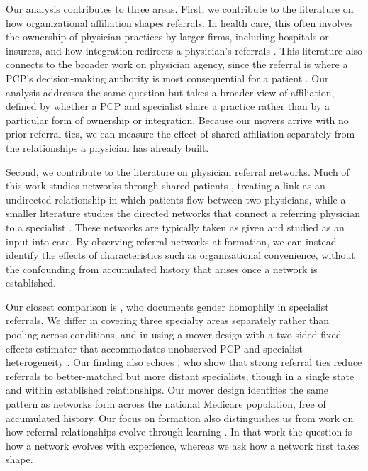 \documentclass[12pt]{article}
\begin{document}
Our analysis contributes to three areas. First, we contribute to the literature on how organizational affiliation shapes referrals. In health care, this often involves the ownership of physician practices by larger firms, including hospitals or insurers, and how integration redirects a physician's referrals \citep{baker2016, walden2016, singh2023, whaley2024-jpube, cutler2026}. This literature also connects to the broader work on physician agency, since the referral is where a PCP's decision-making authority is most consequential for a patient \citep{freedman2015, barkowski2018, chernew2021, lin2025}. Our analysis addresses the same question but takes a broader view of affiliation, defined by whether a PCP and specialist share a practice rather than by a particular form of ownership or integration. Because our movers arrive with no prior referral ties, we can measure the effect of shared affiliation separately from the relationships a physician has already built.

Second, we contribute to the literature on physician referral networks. Much of this work studies networks through shared patients \citep{landon2012, barnett2012mc, landon2018, linde2019}, treating a link as an undirected relationship in which patients flow between two physicians, while a smaller literature studies the directed networks that connect a referring physician to a specialist \citep{agha2019, agha2018, zeltzer2020}. These networks are typically taken as given and studied as an input into care. By observing referral networks at formation, we can instead identify the effects of characteristics such as organizational convenience, without the confounding from accumulated history that arises once a network is established.

Our closest comparison is \cite{zeltzer2020}, who documents gender homophily in specialist referrals. We differ in covering three specialty areas separately rather than pooling across conditions, and in using a mover design with a two-sided fixed-effects estimator that accommodates unobserved PCP and specialist heterogeneity \citep{jochmans2018, jochmans_fixedeffect_2019, graham_econometric_2017, dzemski2019}. Our finding also echoes \cite{devaan2024}, who show that strong referral ties reduce referrals to better-matched but more distant specialists, though in a single state and within established relationships. Our mover design identifies the same pattern as networks form across the national Medicare population, free of accumulated history. Our focus on formation also distinguishes us from work on how referral relationships evolve through learning \citep{mccarthy2026}. In that work the question is how a network evolves with experience, whereas we ask how a network first takes shape.
\end{document}
